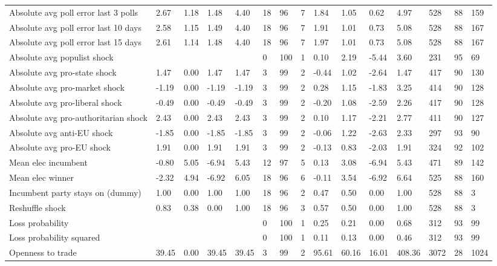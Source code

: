 \begin{longtable}{lllllllllllllll}
\addlinespace
Absolute avg poll error last 3 polls & 2.67 & 1.18 & 1.48 & 4.40 & 18 & 96 & 7 & 1.84 & 1.05 & 0.62 & 4.97 & 528 & 88 & 159\\
Absolute avg poll error last 10 days & 2.58 & 1.15 & 1.49 & 4.40 & 18 & 96 & 7 & 1.91 & 1.01 & 0.73 & 5.08 & 528 & 88 & 167\\
Absolute avg poll error last 15 days & 2.61 & 1.14 & 1.48 & 4.40 & 18 & 96 & 7 & 1.97 & 1.01 & 0.73 & 5.08 & 528 & 88 & 167\\
Absolute avg populist shock &  &  &  &  & 0 & 100 & 1 & 0.10 & 2.19 & -5.44 & 3.60 & 231 & 95 & 69\\
Absolute avg pro-state shock & 1.47 & 0.00 & 1.47 & 1.47 & 3 & 99 & 2 & -0.44 & 1.02 & -2.64 & 1.47 & 417 & 90 & 130\\
\addlinespace
Absolute avg pro-market shock & -1.19 & 0.00 & -1.19 & -1.19 & 3 & 99 & 2 & 0.28 & 1.15 & -1.83 & 3.25 & 414 & 90 & 128\\
Absolute avg pro-liberal shock & -0.49 & 0.00 & -0.49 & -0.49 & 3 & 99 & 2 & -0.20 & 1.08 & -2.59 & 2.26 & 417 & 90 & 128\\
Absolute avg pro-authoritarian shock & 2.43 & 0.00 & 2.43 & 2.43 & 3 & 99 & 2 & 0.10 & 1.17 & -2.21 & 2.77 & 411 & 90 & 127\\
Absolute avg anti-EU shock & -1.85 & 0.00 & -1.85 & -1.85 & 3 & 99 & 2 & -0.06 & 1.22 & -2.63 & 2.33 & 297 & 93 & 90\\
Absolute avg pro-EU shock & 1.91 & 0.00 & 1.91 & 1.91 & 3 & 99 & 2 & -0.13 & 0.83 & -2.03 & 1.91 & 324 & 92 & 102\\
\addlinespace
Mean elec incumbent & -0.80 & 5.05 & -6.94 & 5.43 & 12 & 97 & 5 & 0.13 & 3.08 & -6.94 & 5.43 & 471 & 89 & 142\\
Mean elec winner & -2.32 & 4.94 & -6.92 & 6.05 & 18 & 96 & 6 & -0.11 & 3.54 & -6.92 & 6.64 & 525 & 88 & 160\\
Incumbent party stays on (dummy) & 1.00 & 0.00 & 1.00 & 1.00 & 18 & 96 & 2 & 0.47 & 0.50 & 0.00 & 1.00 & 528 & 88 & 3\\
Reshuffle shock & 0.83 & 0.38 & 0.00 & 1.00 & 18 & 96 & 3 & 0.57 & 0.50 & 0.00 & 1.00 & 528 & 88 & 3\\
Loss probability &  &  &  &  & 0 & 100 & 1 & 0.25 & 0.21 & 0.00 & 0.68 & 312 & 93 & 99\\
\addlinespace
Loss probability squared &  &  &  &  & 0 & 100 & 1 & 0.11 & 0.13 & 0.00 & 0.46 & 312 & 93 & 99\\
Openness to trade & 39.45 & 0.00 & 39.45 & 39.45 & 3 & 99 & 2 & 95.61 & 60.16 & 16.01 & 408.36 & 3072 & 28 & 1024\\

\end{longtable}
